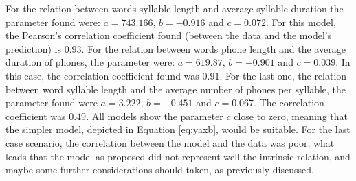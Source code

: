 For the relation between words syllable length and average syllable duration the parameter found were:
$a = 743.166$, $b = -0.916$ and $c = 0.072$. For this model, the Pearson's correlation coefficient found
(between the data and the model's prediction) is $0.93$.
For the  relation between words phone length and the average duration 
of phones, the parameter were: $a = 619.87$, $b = -0.901$ and $c = 0.039$.
In this case, the correlation coefficient found was $0.91$.
For the last one, the relation between word syllable length and the average number of phones per syllable, the
parameter found were $a = 3.222$, $b = -0.451$ and $c = 0.067$. The correlation coefficient was $0.49$.
All models show the parameter $c$ close to zero, meaning that the simpler model, depicted
in Equation \ref{eq:yaxb}, would be suitable. For the last case scenario, the correlation between the model
and the data was poor, what leads that the model as proposed did not represent well the intrinsic relation,
and maybe some further considerations should taken, as previously discussed.

